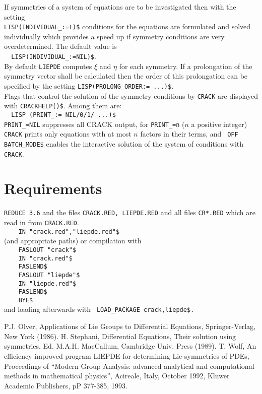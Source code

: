 \documentclass[12pt]{article}
\begin{document}
If symmetries of a system of equations are to be investigated 
then with the setting \\
\verb+LISP(INDIVIDUAL_:=t)$+ conditions for the equations are formulated 
and solved individually which provides a speed up if symmetry conditions are
very overdetermined. The default value is \\ 
\verb+  LISP(INDIVIDUAL_:=NIL)$+. \\
By default {\tt LIEPDE} computes $\xi$ and $\eta$ for each
symmetry. If a prolongation of the symmetry vector shall be calculated
then the order of this prolongation can be specified by the setting 
\verb+LISP(PROLONG_ORDER:= ...)$+. \\
Flags that control the solution of the symmetry conditions by {\tt CRACK}
are displayed with \verb+CRACKHELP()$+. Among them are: \\
\verb+  LISP (PRINT_:= NIL/0/1/ ...)$+ \\
\verb+PRINT_=NIL+ suppresses all CRACK output, for \verb+PRINT_=n+ 
($n$ a positive integer) 
{\tt CRACK} prints only equations with at most $n$ factors in their terms, and 
\verb+ OFF BATCH_MODE$+ 
enables the interactive solution of the system of conditions with {\tt CRACK}.

\section{Requirements}

{\tt REDUCE 3.6} and 
the files {\tt CRACK.RED, LIEPDE.RED} and 
all files {\tt CR*.RED} which are read in from {\tt CRACK.RED}. \\
\verb+    IN "crack.red","liepde.red"$+ \\
(and appropriate paths) or compilation with \\
\verb+    FASLOUT "crack"$+ \\
\verb+    IN "crack.red"$+ \\
\verb+    FASLEND$+ \\
\verb+    FASLOUT "liepde"$+ \\
\verb+    IN "liepde.red"$+ \\
\verb+    FASLEND$+ \\
\verb+    BYE$+ \\
and loading afterwards with \verb+ LOAD_PACKAGE crack,liepde$.+

\begin{thebibliography}{99}
 P.J. Olver, Applications of Lie Groups to Differential
      Equations, Springer-Verlag, New York (1986).
 H. Stephani, Differential Equations, Their solution using
      symmetries, Ed. M.A.H. MacCallum, Cambridge Univ. Press (1989).
 T. Wolf, An efficiency improved program LIEPDE for 
          determining Lie-symmetries
          of PDEs, Proceedings of ``Modern Group Analysis: advanced analytical 
          and computational methods in mathematical physics'', Acireale, Italy,
          October 1992, Kluwer Academic Publishers, pP 377-385, 1993.
\end{thebibliography}
\end{document}
